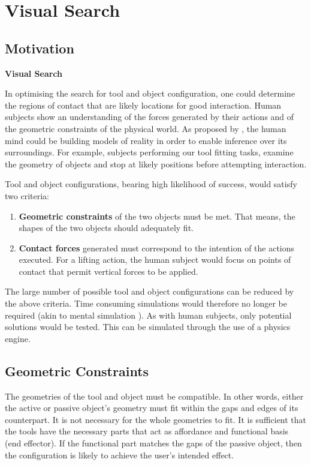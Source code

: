 \documentclass[
    floatsintext
]{article}
\let \shorttitle \textbf
\begin{document}
\section{Visual Search}

\subsection{Motivation}
\shorttitle{Visual Search}

In optimising the search for tool and object configuration, one could determine the regions of contact that are likely locations for good interaction.
Human subjects show an understanding of the forces generated by their actions and of the geometric constraints of the physical world.
As proposed by \cite{battaglia2013}, the human mind could be building models of reality in order to enable inference over its surroundings.
For example, subjects performing our tool fitting tasks, examine the geometry of objects and stop at likely positions before attempting interaction.  

Tool and object configurations, bearing high likelihood of success, would satisfy two criteria: 
\begin{enumerate}
\item \textbf{Geometric constraints} of the two objects must be met. That means, the shapes of the two objects should adequately fit.
\item \textbf{Contact forces} generated must correspond to the intention of the actions executed. 
  For a lifting action, the human subject would focus on points of contact that permit vertical forces to be applied.
\end{enumerate}

The large number of possible tool and object configurations can be reduced by the above criteria. Time consuming simulations would therefore no longer be required (akin to mental simulation \cite{osiurak2014}).
As with human subjects, only potential solutions would be tested. This can be simulated through the use of a physics engine. 

\subsection{Geometric Constraints}
The geometries of the tool and object must be compatible.
In other words, either the active or passive object’s geometry must fit within the gaps and edges of its counterpart.
It is not necessary for the whole geometries to fit.  
It is sufficient that the tools have the necessary parts that act as affordance and functional basis (end effector\cite{zhu2015}).
If the functional part matches the gaps of the passive object, then the configuration is likely to achieve the user's intended effect. 
\end{document}
